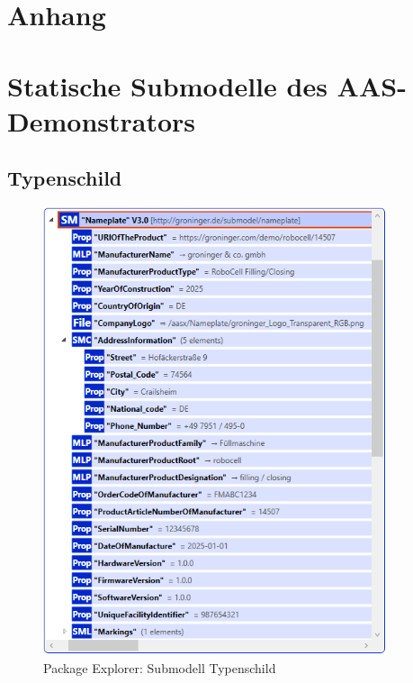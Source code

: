 \section*{Anhang}



\section{Statische Submodelle des AAS-Demonstrators}
\label{sec:AnhangStatischeSubmodelle}
\subsection{Typenschild}
\begin{figure}[H]
    \centering
    \includegraphics[width=0.9\textwidth]{Bilder/ErgebnissePackageExplorer/Typenschild.PNG}
    \caption{Package Explorer: Submodell Typenschild}
\end{figure}

